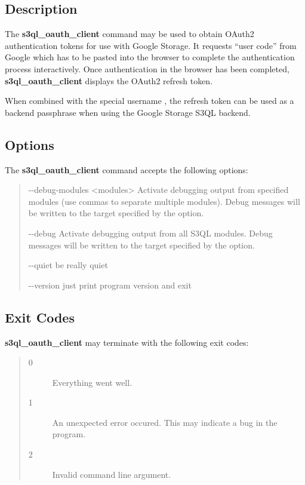 \documentclass[letterpaper,10pt,english]{sphinxmanual}
\begin{document}
\subsection{Description}
\label{man/oauth_client:description}
The \textbf{s3ql\_oauth\_client} command may be used to obtain OAuth2 authentication
tokens for use with Google Storage. It requests ``user code'' from
Google which has to be pasted into the browser to complete the
authentication process interactively. Once authentication in the
browser has been completed, \textbf{s3ql\_oauth\_client} displays the OAuth2 refresh
token.

When combined with the special username , the refresh token
can be used as a backend passphrase when using the Google Storage S3QL
backend.


\subsection{Options}
\label{man/oauth_client:options}
The \textbf{s3ql\_oauth\_client} command accepts the following options:
\begin{quote}
\begin{optionlist}{3cm}
\item [-{-}debug-modules \textless{}modules\textgreater{}]  
Activate debugging output from specified modules (use
commas to separate multiple modules). Debug messages
will be written to the target specified by the
 option.
\item [-{-}debug]  
Activate debugging output from all S3QL modules. Debug
messages will be written to the target specified by
the  option.
\item [-{-}quiet]  
be really quiet
\item [-{-}version]  
just print program version and exit
\end{optionlist}
\end{quote}


\subsection{Exit Codes}
\label{man/oauth_client:exit-codes}
\textbf{s3ql\_oauth\_client} may terminate with the following exit codes:
\begin{quote}\begin{description}
\item[{0}] \leavevmode
Everything went well.

\item[{1}] \leavevmode
An unexpected error occured. This may indicate a bug in the
program.

\item[{2}] \leavevmode
Invalid command line argument.

\end{description}\end{quote}
\end{document}
